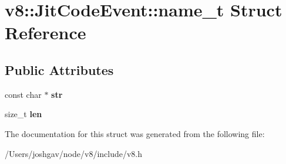 \hypertarget{structv8_1_1_jit_code_event_1_1name__t}{}\section{v8\+:\+:Jit\+Code\+Event\+:\+:name\+\_\+t Struct Reference}
\label{structv8_1_1_jit_code_event_1_1name__t}
\subsection*{Public Attributes}
\begin{DoxyCompactItemize}
\item 
const char $\ast$ {\bfseries str}\hypertarget{structv8_1_1_jit_code_event_1_1name__t_a344732b4289a6a1fd21bb577ac9eff15}{}\label{structv8_1_1_jit_code_event_1_1name__t_a344732b4289a6a1fd21bb577ac9eff15}

\item 
size\+\_\+t {\bfseries len}\hypertarget{structv8_1_1_jit_code_event_1_1name__t_aa85ddd240f3b08c995caa8267ee8c586}{}\label{structv8_1_1_jit_code_event_1_1name__t_aa85ddd240f3b08c995caa8267ee8c586}

\end{DoxyCompactItemize}


The documentation for this struct was generated from the following file\+:\begin{DoxyCompactItemize}
\item 
/\+Users/joshgav/node/v8/include/v8.\+h\end{DoxyCompactItemize}
